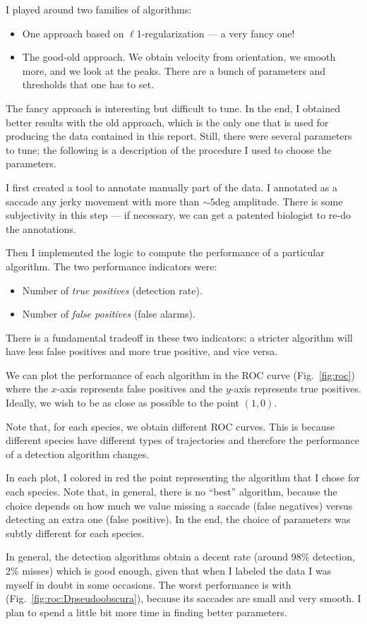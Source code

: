 
I played around two families of algorithms:
\begin{itemize}
	\item One approach based on $\ell$1-regularization \cite{trend-filtering} --- a very fancy one! 
	\item The good-old approach. We obtain velocity from orientation, we smooth more, and we look at the peaks. There are a bunch of parameters and thresholds that one has to set.
\end{itemize}
The fancy approach is interesting but difficult to tune. In the end, I obtained better results with the old approach, which is the only one that is used for producing the data contained in this report.  Still, there were several parameters to tune;
the following is a description of the procedure I used to choose the parameters.

I first created a tool to annotate manually part of the data. 
I annotated as a saccade any jerky movement with more than $\sim5$deg amplitude. 
There is some subjectivity in this step --- if necessary, we can get a patented biologist to re-do the annotations.

Then I implemented the logic to compute the performance of a particular algorithm.
The two performance indicators were:
\begin{itemize}
	\item Number of \emph{true positives} (detection rate).
	\item Number of \emph{false positives} (false alarms).
\end{itemize}
There is a fundamental tradeoff in these two indicators: a stricter algorithm will have less false positives and more true positive, and vice versa.

We can plot the performance of each algorithm in the ROC curve (Fig.~\vref{fig:roc}) where the $x$-axis represents false positives and the $y$-axis represents true positives. Ideally, we wish to be as close as possible to the point $(1,0)$.

Note that, for each species, we obtain different ROC curves. This is because different species have different types of trajectories and therefore the performance of a detection algorithm changes. 

In each plot, I colored in red the point representing the algorithm that I chose for each species. Note that, in general, there is no ``best'' algorithm, because the choice depends on how much we value missing a saccade (false negatives) versus detecting an extra one (false positive). In the end, the choice of parameters was subtly different for each species.

In general, the detection algorithms obtain a decent rate (around 98\% detection, 2\% misses) which is good enough, given that when I labeled the data I was myself in doubt in some occasions.
The worst performance is with \Dpseudoobscura (Fig.~\ref{fig:roc:Dpseudoobscura}), because its saccades are small and very smooth. I plan to spend a little bit more time in finding better parameters.

